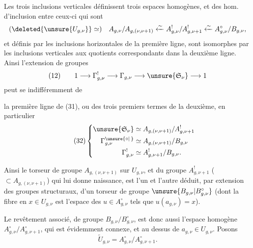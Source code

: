 Les trois inclusions verticales définissent trois espaces homogènes, et  des hom. d'inclusion entre ceux-ci qui sont 
\[
(\deleted{\unsure{U_{g,\nu}}}\simeq)\quad
A_{g,\nu}/A_{g,(\nu,\nu+1)}
\xleftarrow{\sim} A_{g,\nu}^{!}/A_{g,\nu+1}^{!}
\xleftarrow{\sim} A_{g,\nu}^{\circ}/B_{g,\nu},
\]
et    définis par les inclusions horizontales de la première ligne, sont isomorphes par les inclusions verticales aux quotients correspondants dans la deuxième ligne. Ainsi l'extension de groupes
\[
(12)\qquad 1\longrightarrow\Gamma_{g,\nu}^{!}\longrightarrow\Gamma_{g,\nu}\longrightarrow\unsure{\mathfrak S_\nu}\longrightarrow1
\]
peut  se  indifféremment de

la première ligne de (31), ou des trois premiers termes de la deuxième, en particulier
\[
\tag{32}
\left\{\begin{aligned}
\unsure{\mathfrak S_\nu}&\simeq A_{g,(\nu,\nu+1)}/A_{g,\nu+1}^{!}\\
\Gamma_{g,\nu}^{\unsure{\circ|\,}}&\simeq A_{g,(\nu,\nu+1)}/B_{g,\nu}\\
\Gamma_{g,\nu}^{!}&\simeq A_{g,\nu+1}^{!}/B_{g,\nu}.
\end{aligned}\right.
\]

Ainsi le torseur  de groupe $A_{g,(\nu,\nu+1)}$  sur  $U_{g,\nu}$, et  du groupe $A_{g,\nu+1}^{!}$ ($\subset A_{g,(\nu,\nu+1)}$) qui lui donne naissance, est l'un et l'autre déduit, par extension des groupes structuraux, d'un torseur de groupe $\unsure{B_{g,\nu}|B_{g,\nu}^{\circ}}$ (dont la fibre en $x\in U_{g,\nu}$ est l'espace des  $u\in A_{g,\nu}^{\circ}$ tels que $u(a_{g,\nu})=x$).

Le revêtement  associé, de groupe $B_{g,\nu}/B_{g,\nu}^{\circ}$, est donc aussi l'espace homogène $A_{g,\nu}^{\circ}/A_{g,\nu+1}^{\circ}$, qui est évidemment connexe, et  au dessus de $a_{g,\nu}\in U_{g,\nu}$. Posons
\[
\tag{33}
\widetilde U_{g,\nu}=A_{g,\nu}^{\circ}/A_{g,\nu+1}^{\circ}.
\]

